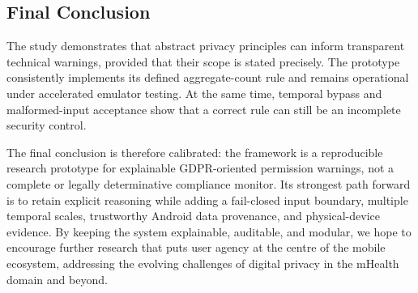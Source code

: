 \subsection{Final Conclusion}

The study demonstrates that abstract privacy principles can inform transparent technical warnings, provided that their scope is stated precisely. The prototype consistently implements its defined aggregate-count rule and remains operational under accelerated emulator testing. At the same time, temporal bypass and malformed-input acceptance show that a correct rule can still be an incomplete security control.

The final conclusion is therefore calibrated: the framework is a reproducible research prototype for explainable GDPR-oriented permission warnings, not a complete or legally determinative compliance monitor. Its strongest path forward is to retain explicit reasoning while adding a fail-closed input boundary, multiple temporal scales, trustworthy Android data provenance, and physical-device evidence. By keeping the system explainable, auditable, and modular, we hope to encourage further research that puts user agency at the centre of the mobile ecosystem, addressing the evolving challenges of digital privacy in the mHealth domain and beyond.

